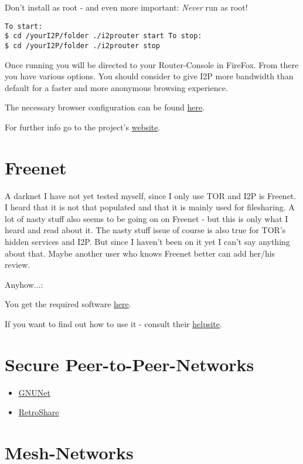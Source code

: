 \documentclass{article}
\begin{document}
 Don't install as root - and even more important: \emph{Never} run as root!
\begin{lstlisting}
To start:
$ cd /yourI2P/folder ./i2prouter start To stop:
$ cd /yourI2P/folder ./i2prouter stop
\end{lstlisting}



 Once running you will be directed to your Router-Console in FireFox. From there you have various options. You should consider to give I2P more bandwidth than default for a faster and more anonymous browsing experience. 


 The necessary browser configuration can be found \href{https://www.i2p2.de/htproxyports.html}{here}.


 For further info go to the project's \href{https://www.i2p2.de}{website}.
\section{Freenet}


 A darknet I have not yet tested myself, since I only use TOR and I2P is Freenet. I heard that it is not that populated and that it is mainly used for filesharing. A lot of nasty stuff also seems to be going on on Freenet - but this is only what I heard and read about it. The nasty stuff issue of course is also true for TOR's hidden services and I2P. But since I haven't been on it yet I can't say anything about that. Maybe another user who knows Freenet better can add her/his review. 


 Anyhow...:


 You get the required software \href{https://freenetproject.org/}{here}.


 If you want to find out how to use it - consult their \href{http://www.freenethelp.org/html/FreenetForDummies.html}{helpsite}.
\section{Secure Peer-to-Peer-Networks}
\begin{itemize}
	\item \href{https://gnunet.org/}{GNUNet}
	\item \href{http://retroshare.sourceforge.net/}{RetroShare}
\end{itemize}
\section{Mesh-Networks}
\end{document}
